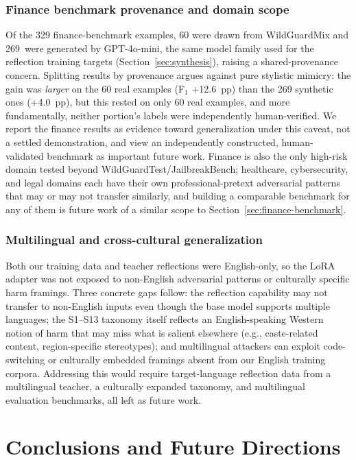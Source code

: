 \documentclass[superintelligence,article,accept,moreauthors]{Definitions/mdpi}
\begin{document}
\subsubsection{Finance benchmark provenance and domain scope}
Of the 329 finance-benchmark examples, 60 were drawn from WildGuardMix and 269~were generated by GPT-4o-mini, the same model family used for the reflection training targets (Section~\ref{sec:synthesis}), raising a shared-provenance concern. Splitting results by provenance argues against pure stylistic mimicry: the gain was \emph{larger} on the 60 real examples (F$_1$ +12.6~pp) than the 269 synthetic ones (+4.0~pp), but this rested on only 60 real examples, and more fundamentally, neither portion's labels were independently human-verified. We report the finance results as evidence toward generalization under this caveat, not a settled demonstration, and view an independently constructed, human-validated benchmark as important future work. Finance is also the only high-risk domain tested beyond WildGuardTest/JailbreakBench; healthcare, cybersecurity, and legal domains each have their own professional-pretext adversarial patterns that may or may not transfer similarly, and building a comparable benchmark for any of them is future work of a similar scope to Section~\ref{sec:finance-benchmark}.

\subsubsection{Multilingual and cross-cultural generalization}
Both our training data and teacher reflections were English-only, so the LoRA adapter was not exposed to non-English adversarial patterns or culturally specific harm framings. Three concrete gaps follow: the reflection capability may not transfer to non-English inputs even though the base model supports multiple languages; the S1--S13 taxonomy itself reflects an English-speaking Western notion of harm that may miss what is salient elsewhere (e.g., caste-related content, region-specific stereotypes); and multilingual attackers can exploit code-switching or culturally embedded framings absent from our English training corpora. Addressing this would require target-language reflection data from a multilingual teacher, a culturally expanded taxonomy, and multilingual evaluation benchmarks, all left as future work.

\section{Conclusions and Future Directions}
\end{document}
